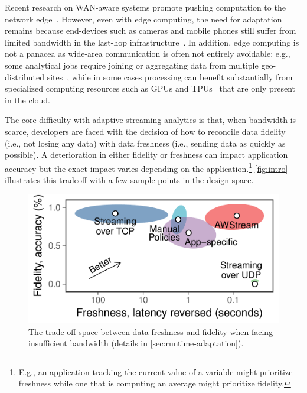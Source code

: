 Recent research on WAN-aware systems promote pushing computation to the network
edge~\cite{rabkin2014aggregation, satyanarayanan2009case}.  However, even with
edge computing, the need for adaptation remains because end-devices such as
cameras and mobile phones still suffer from limited bandwidth in the last-hop
infrastructure~\cite{abari2017enabling, zhang2015design}.  In addition, edge
computing is not a panacea as wide-area communication is often not entirely
avoidable: e.g., some analytical jobs require joining or aggregating data from
multiple geo-distributed sites~\cite{pu2015low, viswanathan2016clarinet}, while
in some cases processing can benefit substantially from specialized computing
resources such as GPUs and TPUs~\cite{abadi2016tensorflow} that are only present
in the cloud.

The core difficulty with adaptive streaming analytics is that, when bandwidth is
scarce, developers are faced with the decision of how to reconcile data fidelity
(i.e., not losing any data) with data freshness (i.e., sending data as quickly
as possible). A deterioration in either fidelity or freshness can impact
application accuracy but the exact impact varies depending on the
application.\footnote{E.g., an application tracking the current value of a
  variable might prioritize freshness while one that is computing an average
  might prioritize fidelity.}  \autoref{fig:intro} illustrates this tradeoff
with a few sample points in the design space.

\begin{figure}
  \centering
  \includegraphics[width=0.8\columnwidth]{figures/figure1.pdf}
  \caption{The trade-off space between data freshness and fidelity when facing
    insufficient bandwidth (details in \autoref{sec:runtime-adaptation}).}
  \label{fig:intro}
  \vspace{-0.5em}
\end{figure}

